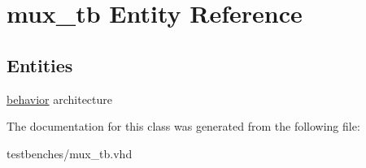 \hypertarget{classmux__tb}{\section{mux\-\_\-tb \-Entity \-Reference}
\label{classmux__tb}
}
\subsection*{\-Entities}
\begin{DoxyCompactItemize}
\item 
\hyperlink{classmux__tb_1_1behavior}{behavior} architecture
\end{DoxyCompactItemize}


\-The documentation for this class was generated from the following file\-:\begin{DoxyCompactItemize}
\item 
testbenches/mux\-\_\-tb.\-vhd\end{DoxyCompactItemize}
